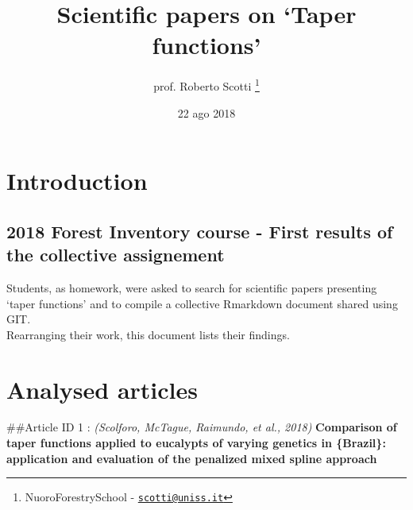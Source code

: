 \documentclass[]{article}
\title{Scientific papers on `Taper functions'}
\author{prof. Roberto Scotti \footnote{NuoroForestrySchool -
  \href{mailto:scotti@uniss.it}{\nolinkurl{scotti@uniss.it}}}}
\date{22 ago 2018}
\begin{document}
\maketitle

\hypertarget{introduction}{%
\section{Introduction}\label{introduction}}

\hypertarget{forest-inventory-course---first-results-of-the-collective-assignement}{%
\subsection{2018 Forest Inventory course - First results of the
collective
assignement}\label{forest-inventory-course---first-results-of-the-collective-assignement}}

Students, as homework, were asked to search for scientific papers
presenting `taper functions' and to compile a collective Rmarkdown
document shared using GIT.\\
Rearranging their work, this document lists their findings.

\hypertarget{analysed-articles}{%
\section{Analysed articles}\label{analysed-articles}}

\#\#Article ID 1 : \emph{(Scolforo, McTague, Raimundo, et al., 2018)}
\textbf{Comparison of taper functions applied to eucalypts of varying
genetics in \{Brazil\}: application and evaluation of the penalized
mixed spline approach}
\end{document}
